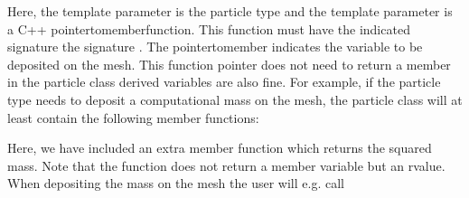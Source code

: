 \documentclass[letterpaper,10pt,english]{sphinxmanual}
\begin{document}
Here, the template parameter  is the particle type and the template parameter  is a C++ pointer\sphinxhyphen{}to\sphinxhyphen{}member\sphinxhyphen{}function.
This function must have the indicated signature   the signature .
The pointer\sphinxhyphen{}to\sphinxhyphen{}member  indicates the variable to be deposited on the mesh.
This function pointer does not need to return a member in the particle class \sphinxhyphen{} derived variables are also fine.
For example, if the particle type  needs to deposit a computational mass on the mesh, the particle class will at least contain the following member functions:

\begin{sphinxVerbatim}[commandchars=\\\{\},formatcom=\scriptsize]
     

       
       

      
       


    
\end{sphinxVerbatim}

Here, we have included an extra member function  which returns the squared mass.
Note that the function does not return a member variable but an r\sphinxhyphen{}value.
When depositing the mass on the mesh the user will e.g. call

\begin{sphinxVerbatim}[commandchars=\\\{\},formatcom=\scriptsize]
 

  
  
\end{sphinxVerbatim}
\end{document}
